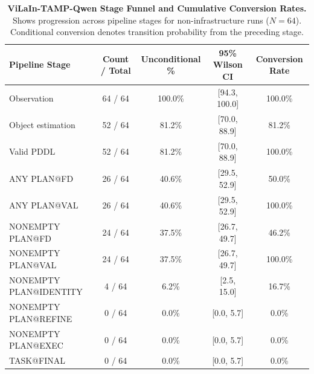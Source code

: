 \begin{table}[t]
\centering
\small
\caption{\textbf{ViLaIn-TAMP-Qwen Stage Funnel and Cumulative Conversion Rates.}
Shows progression across pipeline stages for non-infrastructure runs ($N=64$).
Conditional conversion denotes transition probability from the preceding stage.}
\label{tab:vilain_qwen_funnel}
\begin{tabular}{l|c|c|c|c}
\hline
\textbf{Pipeline Stage} & \textbf{Count / Total} & \textbf{Unconditional \%} & \textbf{95\% Wilson CI} & \textbf{Conversion Rate} \\
\hline
Observation & 64 / 64 & 100.0\% & [94.3, 100.0] & 100.0\% \\
Object estimation & 52 / 64 & 81.2\% & [70.0, 88.9] & 81.2\% \\
Valid PDDL & 52 / 64 & 81.2\% & [70.0, 88.9] & 100.0\% \\
ANY PLAN@FD & 26 / 64 & 40.6\% & [29.5, 52.9] & 50.0\% \\
ANY PLAN@VAL & 26 / 64 & 40.6\% & [29.5, 52.9] & 100.0\% \\
NONEMPTY PLAN@FD & 24 / 64 & 37.5\% & [26.7, 49.7] & 46.2\% \\
NONEMPTY PLAN@VAL & 24 / 64 & 37.5\% & [26.7, 49.7] & 100.0\% \\
NONEMPTY PLAN@IDENTITY & 4 / 64 & 6.2\% & [2.5, 15.0] & 16.7\% \\
NONEMPTY PLAN@REFINE & 0 / 64 & 0.0\% & [0.0, 5.7] & 0.0\% \\
NONEMPTY PLAN@EXEC & 0 / 64 & 0.0\% & [0.0, 5.7] & 0.0\% \\
TASK@FINAL & 0 / 64 & 0.0\% & [0.0, 5.7] & 0.0\% \\
\hline
\end{tabular}
\end{table}
